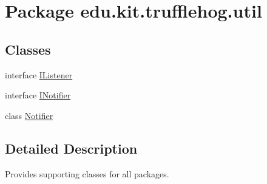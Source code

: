 \hypertarget{namespaceedu_1_1kit_1_1trufflehog_1_1util}{}\section{Package edu.\+kit.\+trufflehog.\+util}
\label{namespaceedu_1_1kit_1_1trufflehog_1_1util}
\subsection*{Classes}
\begin{DoxyCompactItemize}
\item 
interface \hyperlink{interfaceedu_1_1kit_1_1trufflehog_1_1util_1_1_i_listener}{I\+Listener}
\item 
interface \hyperlink{interfaceedu_1_1kit_1_1trufflehog_1_1util_1_1_i_notifier}{I\+Notifier}
\item 
class \hyperlink{classedu_1_1kit_1_1trufflehog_1_1util_1_1_notifier}{Notifier}
\end{DoxyCompactItemize}


\subsection{Detailed Description}
Provides supporting classes for all packages. 